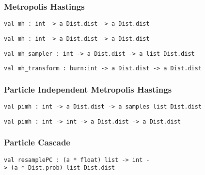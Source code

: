 \hypertarget{infux5fmh}{\subsubsection{\texorpdfstring{\protect\hyperlink{infux5fmh}{}Metropolis
Hastings}{Metropolis Hastings}}\label{infux5fmh}}

\protect\hyperlink{val-mhux27}{}\texttt{val\ mh\textquotesingle{}\ :\ int\ -\textgreater{}\ \textquotesingle{}a\ Dist.dist\ -\textgreater{}\ \textquotesingle{}a\ Dist.dist}

\protect\hyperlink{val-mhux27ux27}{}\texttt{val\ mh\textquotesingle{}\textquotesingle{}\ :\ int\ -\textgreater{}\ \textquotesingle{}a\ Dist.dist\ -\textgreater{}\ \textquotesingle{}a\ Dist.dist}

\protect\hyperlink{val-mhux5fsampler}{}\texttt{val\ mh\_sampler\ :\ int\ -\textgreater{}\ \textquotesingle{}a\ Dist.dist\ -\textgreater{}\ \textquotesingle{}a\ list\ Dist.dist}

\protect\hyperlink{val-mhux5ftransform}{}\texttt{val\ mh\_transform\ :\ burn:int\ -\textgreater{}\ \textquotesingle{}a\ Dist.dist\ -\textgreater{}\ \textquotesingle{}a\ Dist.dist}

\hypertarget{infux5fpmcmc}{\subsubsection{\texorpdfstring{\protect\hyperlink{infux5fpmcmc}{}Particle
Independent Metropolis
Hastings}{Particle Independent Metropolis Hastings}}\label{infux5fpmcmc}}

\protect\hyperlink{val-pimh}{}\texttt{val\ pimh\ :\ int\ -\textgreater{}\ \textquotesingle{}a\ Dist.dist\ -\textgreater{}\ \textquotesingle{}a\ samples\ list\ Dist.dist}

\protect\hyperlink{val-pimhux27}{}\texttt{val\ pimh\textquotesingle{}\ :\ int\ -\textgreater{}\ int\ -\textgreater{}\ \textquotesingle{}a\ Dist.dist\ -\textgreater{}\ \textquotesingle{}a\ Dist.dist}

\hypertarget{infux5fpc}{\subsubsection{\texorpdfstring{\protect\hyperlink{infux5fpc}{}Particle
Cascade}{Particle Cascade}}\label{infux5fpc}}

\protect\hyperlink{val-resamplePC}{}\texttt{val\ resamplePC\ :\ (\textquotesingle{}a\ *\ float)\ list\ -\textgreater{}\ int\ -\textgreater{}\ (\textquotesingle{}a\ *\ Dist.prob)\ list\ Dist.dist}

